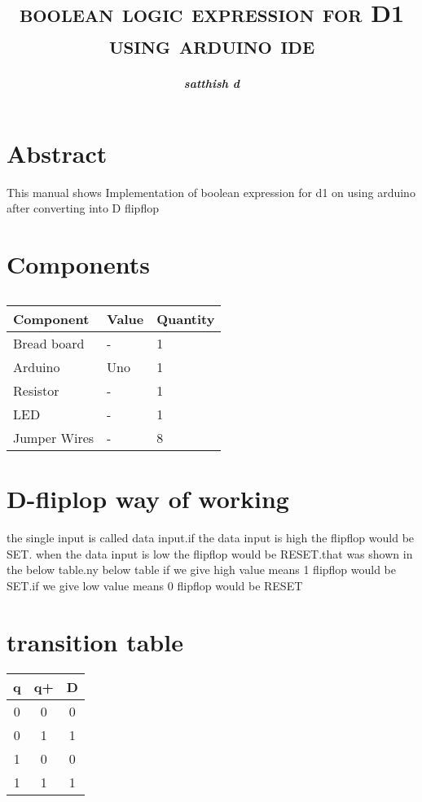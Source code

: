 \documentclass[a4paper,10pt,twocolumn]{article}
\title{\textbf{\textsc{boolean logic expression for D1 using arduino ide}}}
\author{\textit{\textbf{satthish d}}}
\begin{document}
\section{Abstract}
This manual shows Implementation of boolean expression for d1 on using arduino after converting into D flipflop

\section{Components}
\begin{table}[ht]
\resizebox{\columnwidth}{!}
{%
\begin{tabular}{|l|l|l|}
\hline
\textbf{Component} & \textbf{Value} & \textbf{Quantity} \\ \hline
Bread board & - & 1 \\ \hline
Arduino & Uno & 1 \\ \hline
Resistor & - & 1 \\ \hline
LED & - & 1 \\ \hline
Jumper Wires & - & 8 \\ \hline
\end{tabular}%
}
\caption{}
\label{Tabel-1}
\end{table}

\section{D-fliplop way of working}
the single input is called data input.if the data input is high the flipflop would be SET. when the data input is low the flipflop would be RESET.that was shown in the below table.ny below table if we give high value means 1 flipflop would be SET.if we give low value means 0 flipflop would be RESET
\section{transition table}

    \centering
    \begin{tabular}{ |c |c |c |}
\hline
\newline
\textbf{q} & \textbf{q+}  & \textbf{D} \\
\hline
 0 & 0  &0 \\  
 0 & 1  &1 \\ 
 1 & 0  &0 \\ 
 1 & 1  &1 \\ 
 
 \hline
 \end{tabular}
\end{document}
